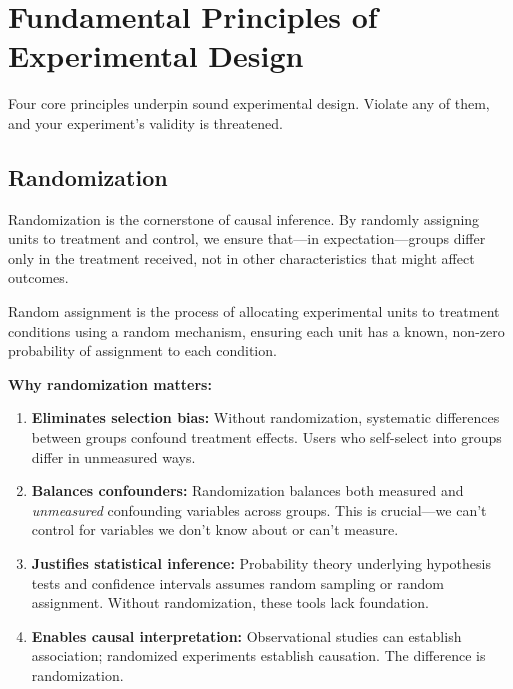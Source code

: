 \section{Fundamental Principles of Experimental Design}

Four core principles underpin sound experimental design. Violate any of them, and your experiment's validity is threatened.

\subsection{Randomization}

Randomization is the cornerstone of causal inference. By randomly assigning units to treatment and control, we ensure that—in expectation—groups differ only in the treatment received, not in other characteristics that might affect outcomes.

\begin{definition}[Randomization]
Random assignment is the process of allocating experimental units to treatment conditions using a random mechanism, ensuring each unit has a known, non-zero probability of assignment to each condition.
\end{definition}

\textbf{Why randomization matters:}

\begin{enumerate}
    \item \textbf{Eliminates selection bias:} Without randomization, systematic differences between groups confound treatment effects. Users who self-select into groups differ in unmeasured ways.

    \item \textbf{Balances confounders:} Randomization balances both measured and \textit{unmeasured} confounding variables across groups. This is crucial—we can't control for variables we don't know about or can't measure.

    \item \textbf{Justifies statistical inference:} Probability theory underlying hypothesis tests and confidence intervals assumes random sampling or random assignment. Without randomization, these tools lack foundation.

    \item \textbf{Enables causal interpretation:} Observational studies can establish association; randomized experiments establish causation. The difference is randomization.
\end{enumerate}

